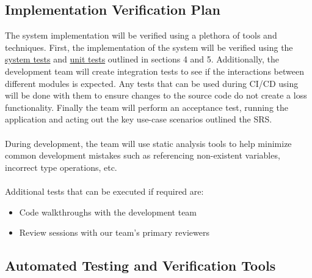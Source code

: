 \documentclass[12pt, titlepage]{article}
\begin{document}
\subsection{Implementation Verification Plan}




The system implementation will be verified using a plethora of tools and techniques. First, the implementation of the system will be verified using the \hyperref[section:systemTests]{system tests} and \hyperref[section:unitTests]{unit tests} outlined in sections 4 and 5. Additionally, the development team will create integration tests to see if the interactions between different modules is expected. Any tests that can be used during CI/CD using will be done with them to ensure changes to the source code do not create a loss functionality. Finally the team will perform an acceptance test, running the application and acting out the key use-case scenarios outlined the SRS.\\
\\
During development, the team will use static analysis tools to help minimize common development mistakes such as referencing non-existent variables, incorrect type operations, etc.\\
\\ Additional tests that can be executed if required are:
\begin{itemize}
\item Code walkthroughs with the development team
\item Review sessions with our team's primary reviewers
\end{itemize}

\subsection{Automated Testing and Verification Tools}
\label{subsec:tools}
\end{document}
